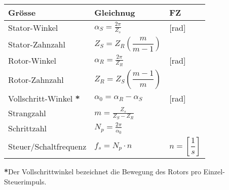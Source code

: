     \begin{minipage}{0.5\linewidth}
        \begin{tabularx}{\linewidth}{|X|l|l|}
            \hline
            \textbf{Grösse}&\textbf{Gleichnug}&\textbf{FZ} \\
            \hline
            Stator-Winkel&$ \alpha_S=\frac{2\pi}{Z_s}$&[rad] \\
            \hline
            Stator-Zahnzahl&$ Z_S= Z_R\left(\dfrac{m}{m-1}\right) $& \\
            \hline    
            Rotor-Winkel&$ \alpha_R=\frac{2\pi}{Z_R}$&[rad] \\
            \hline
            Rotor-Zahnzahl&$Z_R= Z_S\left(\dfrac{m-1}{m}\right) $&\\
            \hline  
            Vollschritt-Winkel \textbf{*}&$ \alpha_0 = \alpha_R - \alpha_S $ &[rad]\\
            \hline    
            Strangzahl&$ m= \frac{Z_s}{Z_S - Z_R} $& \\
            \hline 
            Schrittzahl&$ N_p = \frac{2\pi}{\alpha_0}  $& \\
            \hline        
            Steuer/Schaltfrequenz&$ f_s = N_p \cdot n $&$n=\left[\dfrac{1}{s}\right]$ \\       
            \hline              
        \end{tabularx}\vspace{0.2cm}\newline
        \textbf{*}Der Vollschrittwinkel bezeichnet die Bewegung des \newline
         Rotors pro Einzel-Steuerimpuls.       
    \end{minipage}
    \clearpage
    
